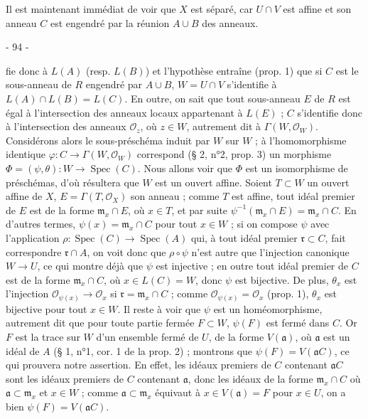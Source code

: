 Il est maintenant immédiat de voir que $X$ est séparé, car $U \cap V$ est affine et son anneau $C$ est engendré par la réunion $A \cup B$ des anneaux.

\newpage


- 94 -

fie donc à $L(A)$ (resp. $L(B)$) et l'hypothèse entraîne (prop. 1) que si $C$ est le sous-anneau de $R$ engendré par $A \cup B$, $W=U \cap V$ s'identifie à $L(A) \cap L(B) = L(C)$. En outre, on sait que tout sous-anneau $E$ de $R$ est égal à l'intersection des anneaux locaux appartenant à $L(E)$ ; $C$ s'identifie donc à l'intersection des anneaux $\mathcal{O}_z$, où $z \in W$, autrement dit à $\Gamma(W, \mathcal{O}_W)$. Considérons alors le sous-préschéma induit par $W$ sur $W$ ; à l'homomorphisme identique $\varphi : C \to \Gamma(W, \mathcal{O}_W)$ correspond (§ 2, n°2, prop. 3) un morphisme $\Phi = (\psi, \theta) : W \to \operatorname{Spec}(C)$. Nous allons voir que $\Phi$ est un isomorphisme de préschémas, d'où résultera que $W$ est un ouvert affine. Soient $T \subset W$ un ouvert affine de $X$, $E = \Gamma(T, \mathcal{O}_X)$ son anneau ; comme $T$ est affine, tout idéal premier de $E$ est de la forme $\mathfrak{m}_x \cap E$, où $x \in T$, et par suite $\psi^{-1}(\mathfrak{m}_x \cap E) = \mathfrak{m}_x \cap C$. En d'autres termes, $\psi(x) = \mathfrak{m}_x \cap C$ pour tout $x \in W$ ; si on compose $\psi$ avec l'application $\rho : \operatorname{Spec}(C) \to \operatorname{Spec}(A)$ qui, à tout idéal premier $\mathfrak{r} \subset C$, fait correspondre $\mathfrak{r} \cap A$, on voit donc que $\rho \circ \psi$ n'est autre que l'injection canonique $W \to U$, ce qui montre déjà que $\psi$ est injective ; en outre tout idéal premier de $C$ est de la forme $\mathfrak{m}_x \cap C$, où $x \in L(C) = W$, donc $\psi$ est bijective. De plus, $\theta_x$ est l'injection $\mathcal{O}_{\psi(x)} \to \mathcal{O}_x$ si $\mathfrak{r} = \mathfrak{m}_x \cap C$ ; comme $\mathcal{O}_{\psi(x)} = \mathcal{O}_x$ (prop. 1), $\theta_x$ est bijective pour tout $x \in W$. Il reste à voir que $\psi$ est un homéomorphisme, autrement dit que pour toute partie fermée $F \subset W$, $\psi(F)$ est fermé dans $C$. Or $F$ est la trace sur $W$ d'un ensemble fermé de $U$, de la forme $V(\mathfrak{a})$, où $\mathfrak{a}$ est un idéal de $A$ (§ 1, n°1, cor. 1 de la prop. 2) ; montrons que $\psi(F) = V(\mathfrak{a}C)$, ce qui prouvera notre assertion. En effet, les idéaux premiers de $C$ contenant $\mathfrak{a}C$ sont les idéaux premiers de $C$ contenant $\mathfrak{a}$, donc les idéaux de la forme $\mathfrak{m}_x \cap C$ où $\mathfrak{a} \subset \mathfrak{m}_x$ et $x \in W$ ; comme $\mathfrak{a} \subset \mathfrak{m}_x$ équivaut à $x \in V(\mathfrak{a}) = F$ pour $x \in U$, on a bien $\psi(F) = V(\mathfrak{a}C)$.

